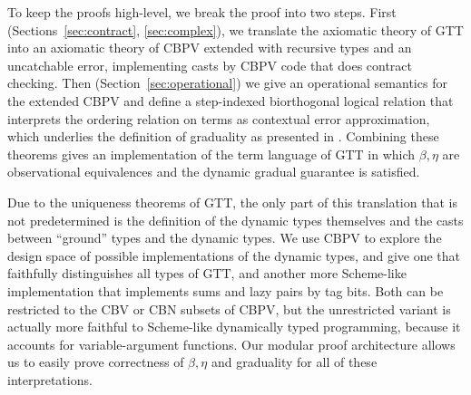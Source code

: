 \documentclass[acmsmall,screen,12pt]{acmart}
\begin{document}
To keep the proofs high-level, we break the proof into two steps.
%
First (Sections~\ref{sec:contract}, \ref{sec:complex}), we translate the
axiomatic theory of GTT into an axiomatic theory of CBPV extended with
recursive types and an uncatchable error, implementing casts by CBPV
code that does contract checking.
%
Then
(Section~\ref{sec:operational}) we give an operational semantics
for the extended CBPV and define a step-indexed biorthogonal logical
relation that interprets the ordering relation on terms as contextual
error approximation, which underlies the definition of graduality as
presented in \citep{newahmed18}.
%
Combining these theorems gives an implementation of the term
language of GTT in which $\beta, \eta$ are observational equivalences
and the dynamic gradual guarantee is satisfied.

Due to the uniqueness theorems of GTT, the only part of this translation that is not
predetermined is the definition of the dynamic types themselves and the
casts between ``ground'' types and the dynamic types.
%
We use CBPV to explore the design space of possible implementations of
the dynamic types, and give one that faithfully distinguishes all types
of GTT, and another more Scheme-like implementation that implements sums
and lazy pairs by tag bits.
%
Both can be restricted to the CBV or CBN subsets of CBPV, but the
unrestricted variant is actually more faithful to Scheme-like
dynamically typed programming, because it accounts for variable-argument
functions.
%
Our modular proof architecture allows us to easily prove correctness
of $\beta, \eta$ and graduality for all of these interpretations.
\end{document}
